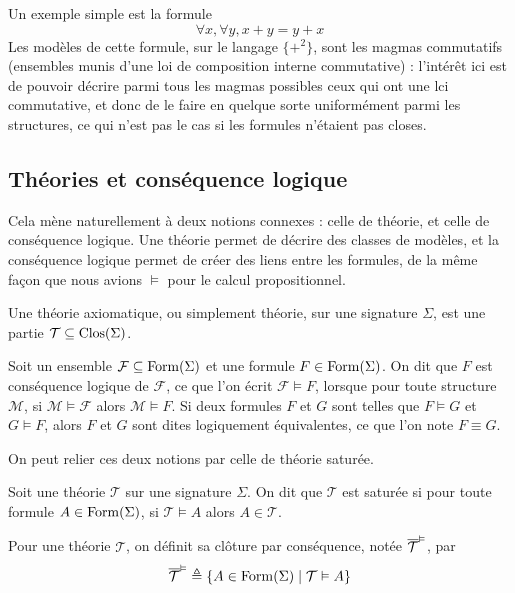 Un exemple simple est la formule
\[\forall x,\forall y, x + y = y + x\]
Les modèles de cette formule, sur le langage $\{+^2\}$, sont les magmas
commutatifs (ensembles munis d'une loi de composition interne commutative) :
l'intérêt ici est de pouvoir décrire parmi tous les magmas possibles ceux qui
ont une lci commutative, et donc de le faire en quelque sorte uniformément parmi
les structures, ce qui n'est pas le cas si les formules n'étaient pas closes.

\subsection{Théories et conséquence logique}

Cela mène naturellement à deux notions connexes : celle de théorie, et celle
de conséquence logique. Une théorie permet de décrire des classes de modèles, et
la conséquence logique permet de créer des liens entre les formules, de la même
façon que nous avions $\vDash$ pour le calcul propositionnel.

\begin{definition}[Théorie]
  Une théorie axiomatique, ou simplement théorie, sur une signature $\Sigma$, est
  une partie $\mathcal T\subseteq\operatorname{Clos}(\Sigma)$.
\end{definition}

\begin{definition}
  Soit un ensemble $\mathcal F \subseteq \operatorname{Form}(\Sigma)$ et une formule
  $F\in\operatorname{Form}(\Sigma)$. On dit que $F$ est conséquence logique de $\mathcal F$,
  ce que l'on écrit $\mathcal F \vDash F$, lorsque pour toute structure
  $\mathcal M$, si $\mathcal M\models \mathcal F$ alors $\mathcal M\models F$.
  Si deux formules $F$ et $G$ sont telles que $F\vDash G$ et $G\vDash F$, alors
  $F$ et $G$ sont dites logiquement équivalentes, ce que l'on note $F\equiv G$.
\end{definition}

On peut relier ces deux notions par celle de théorie saturée.

\begin{definition}
  Soit une théorie $\mathcal T$ sur une signature $\Sigma$. On dit que
  $\mathcal T$ est saturée si pour toute formule $A\in\operatorname{Form}(\Sigma)$,
  si $\mathcal T\vDash A$ alors $A\in \mathcal T$.

  Pour une théorie $\mathcal T$, on définit sa clôture par conséquence, notée
  $\overline{\mathcal T}^{\vDash}$, par
  \[\overline{\mathcal T}^{\vDash} \triangleq \{ A \in \operatorname{Form}(\Sigma)
  \mid \mathcal T \vDash A\}\]
\end{definition}

